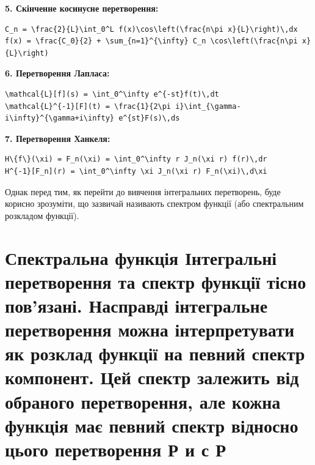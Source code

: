 \documentclass[
  ukrainian,
]{article}
\begin{document}
\textbf{5. Скінченне косинусне перетворення:}

\begin{verbatim}
C_n = \frac{2}{L}\int_0^L f(x)\cos\left(\frac{n\pi x}{L}\right)\,dx
f(x) = \frac{C_0}{2} + \sum_{n=1}^{\infty} C_n \cos\left(\frac{n\pi x}{L}\right)
\end{verbatim}

\textbf{6. Перетворення Лапласа:}

\begin{verbatim}
\mathcal{L}[f](s) = \int_0^\infty e^{-st}f(t)\,dt
\mathcal{L}^{-1}[F](t) = \frac{1}{2\pi i}\int_{\gamma-i\infty}^{\gamma+i\infty} e^{st}F(s)\,ds
\end{verbatim}

\textbf{7. Перетворення Ханкеля:}

\begin{verbatim}
H\{f\}(\xi) = F_n(\xi) = \int_0^\infty r J_n(\xi r) f(r)\,dr
H^{-1}[F_n](r) = \int_0^\infty \xi J_n(\xi r) F_n(\xi)\,d\xi
\end{verbatim}

Однак перед тим, як перейти до вивчення інтегральних перетворень, буде
корисно зрозуміти, що зазвичай називають спектром функції (або
спектральним розкладом функції).

\section{Спектральна функція Інтегральні перетворення та спектр функції
тісно пов'язані. Насправді інтегральне перетворення можна інтерпретувати
як розклад функції на певний спектр компонент. Цей спектр залежить від
обраного перетворення, але кожна функція має певний спектр відносно
цього перетворення Р и с
Р}\label{ux441ux43fux435ux43aux442ux440ux430ux43bux44cux43dux430-ux444ux443ux43dux43aux446ux456ux44f-ux456ux43dux442ux435ux433ux440ux430ux43bux44cux43dux456-ux43fux435ux440ux435ux442ux432ux43eux440ux435ux43dux43dux44f-ux442ux430-ux441ux43fux435ux43aux442ux440-ux444ux443ux43dux43aux446ux456ux457-ux442ux456ux441ux43dux43e-ux43fux43eux432ux44fux437ux430ux43dux456.-ux43dux430ux441ux43fux440ux430ux432ux434ux456-ux456ux43dux442ux435ux433ux440ux430ux43bux44cux43dux435-ux43fux435ux440ux435ux442ux432ux43eux440ux435ux43dux43dux44f-ux43cux43eux436ux43dux430-ux456ux43dux442ux435ux440ux43fux440ux435ux442ux443ux432ux430ux442ux438-ux44fux43a-ux440ux43eux437ux43aux43bux430ux434-ux444ux443ux43dux43aux446ux456ux457-ux43dux430-ux43fux435ux432ux43dux438ux439-ux441ux43fux435ux43aux442ux440-ux43aux43eux43cux43fux43eux43dux435ux43dux442.-ux446ux435ux439-ux441ux43fux435ux43aux442ux440-ux437ux430ux43bux435ux436ux438ux442ux44c-ux432ux456ux434-ux43eux431ux440ux430ux43dux43eux433ux43e-ux43fux435ux440ux435ux442ux432ux43eux440ux435ux43dux43dux44f-ux430ux43bux435-ux43aux43eux436ux43dux430-ux444ux443ux43dux43aux446ux456ux44f-ux43cux430ux454-ux43fux435ux432ux43dux438ux439-ux441ux43fux435ux43aux442ux440-ux432ux456ux434ux43dux43eux441ux43dux43e-ux446ux44cux43eux433ux43e-ux43fux435ux440ux435ux442ux432ux43eux440ux435ux43dux43dux44f-ux440-ux438-ux441-ux440}
\end{document}
